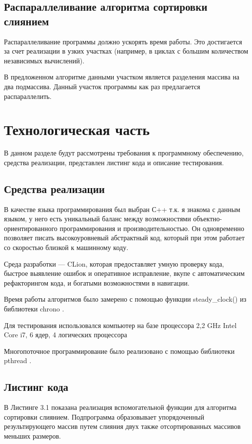 \documentclass[12pt]{report}
\begin{document}
\section{Распараллеливание алгоритма сортировки слиянием}
Распараллеливание программы должно ускорять время работы. Это достигается за счет реализации в узких участках (например, в циклах с большим количеством независимых вычислений).

В предложенном алгоритме данными участком является разделения массива на два подмассива. Данный участок программы как раз предлагается распараллелить.

\chapter{Технологическая часть}
В данном разделе будут рассмотрены требования к программному обеспечению, средства реализации, представлен листинг кода и описание тестирования.

\section{Средства реализации}
В качестве языка программирования был выбран С++ т.к. я знакома с данным языком, у него есть уникальный баланс между возможностями объектно-ориентированного программирования и производительностью. Он одновременно позволяет писать высокоуровневый абстрактный код, который при этом работает со скоростью близкой к машинному коду.

Среда разработки — CLion, которая предоставляет умную проверку кода, быстрое выявление ошибок и оперативное исправление, вкупе с автоматическим рефакторингом кода, и богатыми возможностями в навигации.  

Время работы алгоритмов было замерено с помощью функции steady\_clock() из библиотеки chrono \cite{chrono}. 

Для тестирования использовался компьютер на базе процессора 2,2 GHz Intel Core i7, 6 ядер, 4 логических процессора

Многопоточное программирование было
реализовано с помощью библиотеки pthread \cite{thread}.

\newpage
\section{Листинг кода}

В Листинге 3.1 показана реализация вспомогательной функции для алгоритма сортировки слиянием. Подпрограмма образовывает упорядоченный результирующего массив путем слияния двух также отсортированных массивов меньших размеров.
\end{document}
